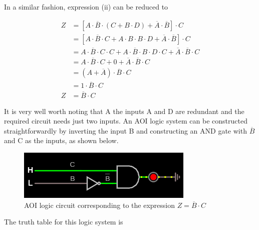 \documentclass{article}
\newcommand{\ol}[1]{\overline{#1}}
\begin{document}
	In a similar fashion, expression (ii) can be reduced to
	
	\begin{align*}
	Z & = [A\cdot\overline{B} \cdot(C + B\cdot D) + \overline{A} \cdot \overline{B}]\cdot C\\
	 & = [A\cdot\overline{B}\cdot C + A\cdot B \cdot B \cdot D + \overline{A} \cdot \overline{B}]\cdot C\\
	 & = A\cdot \ol{B} \cdot C \cdot C + A \cdot \ol{B} \cdot B \cdot D \cdot C + \ol{A} \cdot\ol{B} \cdot C\\
	 & = A\cdot\ol{B} \cdot C + 0 + \ol{A}\cdot\ol{B} \cdot C\\
	 & = (A+\ol{A})\cdot\ol{B}\cdot C\\
	 & = 1 \cdot \ol{B} \cdot C\\
	Z & = \ol{B} \cdot C \tag{2}
	\end{align*}
	
	It is very well worth noting that A the inputs A and D are redundant and the required circuit needs just two inputs. An AOI logic system can be constructed straightforwardly by inverting the input B and constructing an AND gate with $\ol{B}$ and C as the inputs, as shown below.
	
	\begin{figure}[H]
		\centering
		\includegraphics[width=0.75\textwidth]{two}
		\caption{AOI logic circuit corresponding to the expression $ Z = \ol{B}\cdot C$}
		\label{circuit2}
	\end{figure}
	
	The truth table for this logic system is 
	
\end{document}
